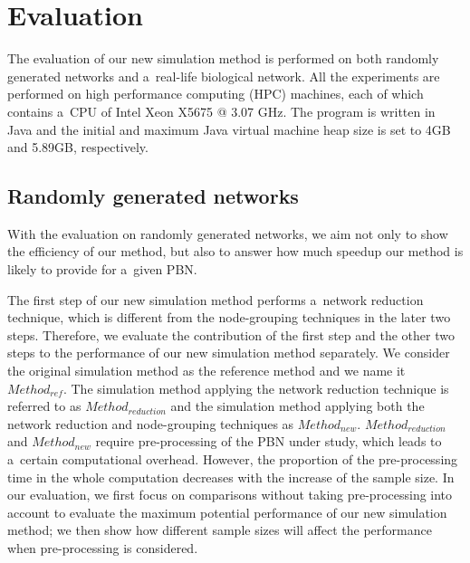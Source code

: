 \documentclass[runningheads,a4paper]{llncs}
\begin{document}
\section{Evaluation}
\label{sec:evaluation}
The evaluation of our new simulation method is performed on both randomly generated networks and
a~real-life biological network. All the experiments are performed on high performance computing
(HPC) machines, each of which contains a~CPU of Intel Xeon X5675 @ 3.07 GHz. The program is
written in Java and the initial and maximum Java virtual machine heap size is set to 4GB and
5.89GB, respectively.

\subsection{Randomly generated networks}
\label{ssec:ernd}
With the evaluation on randomly generated networks, we aim not only to show the efficiency of our
method, but also to answer how much speedup our method is likely to provide for a~given PBN.

The first step of our new simulation method performs a~network reduction technique, which is
different from the node-grouping techniques in the later two steps. Therefore, we evaluate the
contribution of the first step and the other two steps to the performance of our new simulation
method separately. We consider the original simulation method as the reference method and we name
it {\sf $Method_{ref}$}. The simulation method applying the network reduction technique is
referred to as {\sf $Method_{reduction}$} and the simulation method applying both the network
reduction and node-grouping techniques as {\sf $Method_{new}$}. {\sf $Method_{reduction}$} and
{\sf $Method_{new}$} require pre-processing of the PBN under study, which leads to a~certain
computational overhead. However, the proportion of the pre-processing time in the whole
computation decreases with the increase of the sample size. In our evaluation, we first focus on
comparisons without taking pre-processing into account to evaluate the maximum potential
performance of our new simulation method;
we then show how different sample sizes will affect the performance when pre-processing is
considered.
\end{document}
